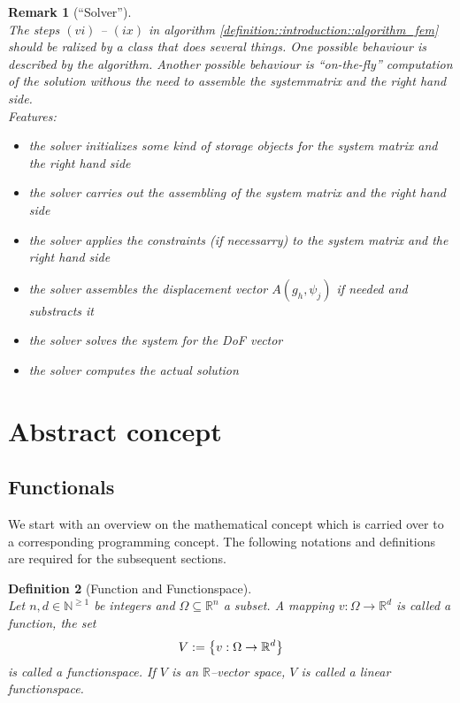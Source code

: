 \documentclass[a4paper,11pt]{article}
\numberwithin{equation}{section}
\newtheorem{definition}{Definition}[section]
\newtheorem{remark}[definition]{Remark}
\newcommand{\theoremNewline}{\hspace{1mm}\\}
\newcommand{\theoremEndLine}{\hspace{1mm}}
\newcommand{\N}{\mathbb{N}}
\newcommand{\R}{\mathbb{R}}
\begin{document}
    \begin{remark}[``Solver'']\theoremNewline
      \label{remark::introduction::solver}
      The steps $(vi)$ -- $(ix)$ in algorithm \ref{definition::introduction::algorithm_fem} should be ralized by a class
      that does several things. One possible behaviour is described by the algorithm. Another possible behaviour is
      ``on-the-fly'' computation of the solution withous the need to assemble the systemmatrix and the right hand
      side.\\
      Features:
      \begin{itemize}
        \item the solver initializes some kind of storage objects for the system matrix and the right hand side
        \item the solver carries out the assembling of the system matrix and the right hand side
        \item the solver applies the constraints (if necessarry) to the system matrix and the right hand side
        \item the solver assembles the displacement vector $A(g_h,\psi_j)$ if needed and substracts it
        \item the solver solves the system for the DoF vector
        \item the solver computes the actual solution
      \end{itemize}
    \end{remark}\theoremEndLine


  \section{Abstract concept}
    \label{section::abstract_concept}

    \subsection{Functionals}

      We start with an overview on the mathematical concept which is carried over to a corresponding programming
      concept. The following notations and definitions are required for the subsequent sections.

      \begin{definition}[Function and Functionspace]\theoremNewline
        \label{definition::abstract_concept::function_functionspace}
        Let ${n,d \in \N^{\geq 1}}$ be integers and ${\Omega \subseteq \mathbb{R}^n}$ a subset. A mapping
        ${v : \Omega \rightarrow \R^d}$ is called a \textnormal{function}, the set
        \begin{align}
          V :=
            \big\{
              v : \Omega \rightarrow \R^d
            \big\}
            \notag
        \end{align}
        is called a \textnormal{functionspace}. If $V$ is an $\R$--vector space, $V$ is called a \textnormal{linear functionspace}.
      \end{definition}\theoremEndLine
\end{document}
